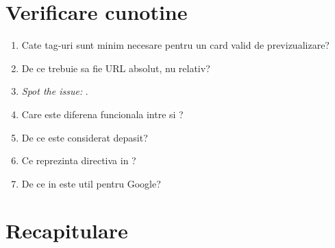 \section*{Verificare cunotine}

\begin{selfcheck}
\begin{enumerate}[itemsep=2pt]
  \item Cate tag-uri  sunt minim necesare pentru un card valid de previzualizare?
  \item De ce  trebuie sa fie URL absolut, nu relativ?
  \item \emph{Spot the issue:} .
  \item Care este diferena funcionala intre  si ?
  \item De ce  este considerat depasit?
  \item Ce reprezinta directiva  in ?
  \item De ce  in  este util pentru Google?
\end{enumerate}
\end{selfcheck}

\section*{Recapitulare}

